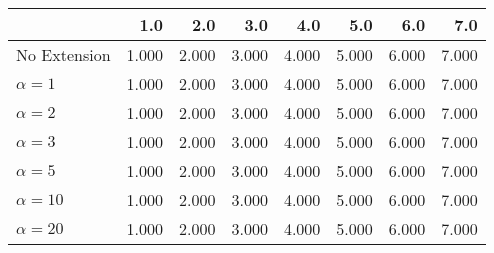 \begin{tabular}{lrrrrrrr}
\toprule
{} &   1.0 &   2.0 &   3.0 &   4.0 &   5.0 &   6.0 &   7.0 \\
\midrule
No Extension  & 1.000 & 2.000 & 3.000 & 4.000 & 5.000 & 6.000 & 7.000 \\
$\alpha = 1$  & 1.000 & 2.000 & 3.000 & 4.000 & 5.000 & 6.000 & 7.000 \\
$\alpha = 2$  & 1.000 & 2.000 & 3.000 & 4.000 & 5.000 & 6.000 & 7.000 \\
$\alpha = 3$  & 1.000 & 2.000 & 3.000 & 4.000 & 5.000 & 6.000 & 7.000 \\
$\alpha = 5$  & 1.000 & 2.000 & 3.000 & 4.000 & 5.000 & 6.000 & 7.000 \\
$\alpha = 10$ & 1.000 & 2.000 & 3.000 & 4.000 & 5.000 & 6.000 & 7.000 \\
$\alpha = 20$ & 1.000 & 2.000 & 3.000 & 4.000 & 5.000 & 6.000 & 7.000 \\
\bottomrule
\end{tabular}
